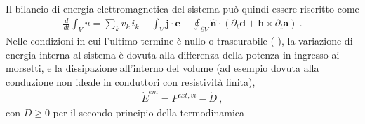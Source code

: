 \documentclass[letterpaper,10pt,english]{jupyterBook}
\begin{document}
\sphinxAtStartPar
Il bilancio di energia elettromagnetica del sistema può quindi essere riscritto come
\begin{equation*}
\begin{split}\frac{d}{dt} \int_V u = \sum_k v_k \, i_k - \int_{V} \mathbf{j} \cdot \mathbf{e} - \oint_{\partial V} \hat{\mathbf{n}} \cdot \left( \partial_t \mathbf{d} + \mathbf{h} \times \partial_t \mathbf{a} \right) \ .\end{split}
\end{equation*}
\sphinxAtStartPar
Nelle condizioni in cui l’ultimo termine è nullo o trascurabile ( ), la variazione di energia interna al sistema è dovuta alla differenza della potenza in ingresso ai morsetti, e la dissipazione all’interno del volume (ad esempio dovuta alla conduzione non ideale in conduttori con resistività finita),
\begin{equation*}
\begin{split}\dot{E}^{em} = P^{ext, vi} - \dot{D} \ ,\end{split}
\end{equation*}
\sphinxAtStartPar
con \(\dot{D} \ge 0\) per il secondo principio della termodinamica  

\sphinxstepscope
\end{document}
